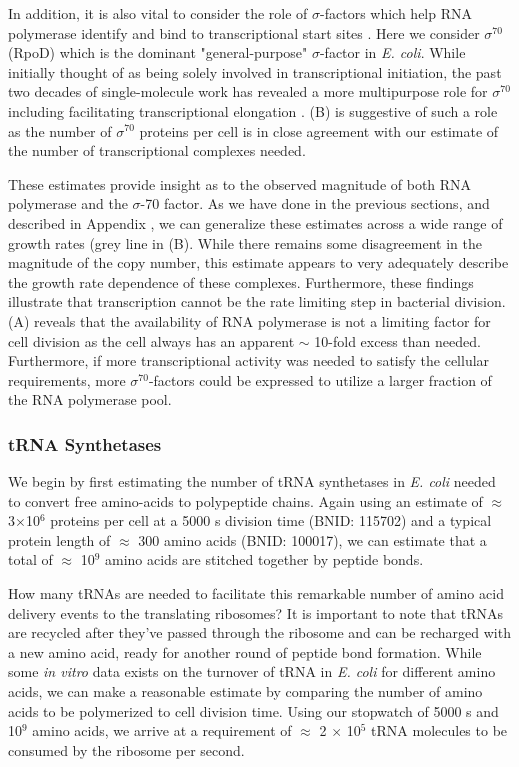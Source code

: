 In addition, it is also vital to consider the role of $\sigma$-factors which
help RNA polymerase identify and bind to transcriptional start sites
\citep{browning2016}. Here we consider $\sigma^{70}$ (RpoD) which is the
dominant "general-purpose" $\sigma$-factor in \textit{E. coli}. While initially
thought of as being solely involved in transcriptional initiation, the past two
decades of single-molecule work has revealed a more multipurpose role for
$\sigma^{70}$ including facilitating transcriptional elongation
\citep{kapanidis2005, goldman2015, perdue2011,mooney2003,mooney2005}.
 (B) is suggestive of such a role as the number of
$\sigma^{70}$ proteins per cell is in close agreement with our estimate of the
number of transcriptional complexes needed.

These estimates provide insight as to the observed magnitude of both RNA
polymerase and the $\sigma$-70 factor. As we have done in the previous sections,
and described in Appendix , we can generalize these estimates
across a wide range of growth rates (grey line in (B). While
there remains some disagreement in the magnitude of the copy number, this
estimate appears to very adequately describe the growth rate dependence of these
complexes. Furthermore, these findings illustrate that transcription
cannot be the rate limiting step in bacterial division.  (A)
reveals that the availability of RNA polymerase is not a limiting factor for
cell division as the cell always has an apparent $\sim$ 10-fold excess than needed.
Furthermore, if more transcriptional activity was needed to satisfy the cellular
requirements, more $\sigma^{70}$-factors could be expressed to utilize a larger
fraction of the RNA polymerase pool.



\subsubsection{tRNA Synthetases}
We begin by first estimating the number of tRNA synthetases in \textit{E.
coli} needed to convert free amino-acids to polypeptide chains. Again using
an estimate of $\approx$ 3$\times$10$^6$ proteins per cell at a 5000 s
division time (BNID: 115702) and a typical protein length of $\approx$ 300
amino acids (BNID: 100017), we can estimate that a total of $\approx$ 10$^9$
amino acids are stitched together by peptide bonds.

How many tRNAs are needed to facilitate this remarkable number of amino acid
delivery events to the translating ribosomes? It is important to note that tRNAs
are recycled after they've passed through the ribosome and can be recharged with
a new amino acid, ready for another round of peptide bond formation. While some
\textit{in vitro} data exists on  the turnover of tRNA in \textit{E. coli} for
different  amino acids, we can make a reasonable estimate by comparing the
number of amino acids to be  polymerized to cell division time. Using our
stopwatch of 5000 s and 10$^9$ amino acids, we arrive at a requirement of
$\approx$ 2 $\times$ 10$^5$ tRNA molecules to be consumed by the ribosome per
second.

